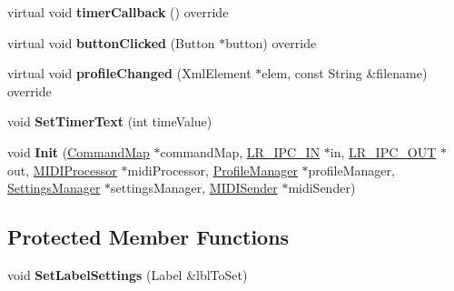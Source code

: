 \begin{DoxyCompactItemize}
\item 
virtual void {\bfseries timer\+Callback} () override\hypertarget{class_main_content_component_a5b7e48a7423f17bc799fc2990f48e38d}{}\label{class_main_content_component_a5b7e48a7423f17bc799fc2990f48e38d}

\item 
virtual void {\bfseries button\+Clicked} (Button $\ast$button) override\hypertarget{class_main_content_component_a72d6b006f4d4a6c4de2ca2e1bde18fc6}{}\label{class_main_content_component_a72d6b006f4d4a6c4de2ca2e1bde18fc6}

\item 
virtual void {\bfseries profile\+Changed} (Xml\+Element $\ast$elem, const String \&filename) override\hypertarget{class_main_content_component_adcb1797e988cf44e5c1811a1ae8144d5}{}\label{class_main_content_component_adcb1797e988cf44e5c1811a1ae8144d5}

\item 
void {\bfseries Set\+Timer\+Text} (int time\+Value)\hypertarget{class_main_content_component_a45f89996ceeb2243081dec7964f8a8c0}{}\label{class_main_content_component_a45f89996ceeb2243081dec7964f8a8c0}

\item 
void {\bfseries Init} (\hyperlink{class_command_map}{Command\+Map} $\ast$command\+Map, \hyperlink{class_l_r___i_p_c___i_n}{L\+R\+\_\+\+I\+P\+C\+\_\+\+IN} $\ast$in, \hyperlink{class_l_r___i_p_c___o_u_t}{L\+R\+\_\+\+I\+P\+C\+\_\+\+O\+UT} $\ast$out, \hyperlink{class_m_i_d_i_processor}{M\+I\+D\+I\+Processor} $\ast$midi\+Processor, \hyperlink{class_profile_manager}{Profile\+Manager} $\ast$profile\+Manager, \hyperlink{class_settings_manager}{Settings\+Manager} $\ast$settings\+Manager, \hyperlink{class_m_i_d_i_sender}{M\+I\+D\+I\+Sender} $\ast$midi\+Sender)\hypertarget{class_main_content_component_affa458ab3832dcd7ec8cc07247492498}{}\label{class_main_content_component_affa458ab3832dcd7ec8cc07247492498}

\end{DoxyCompactItemize}
\subsection*{Protected Member Functions}
\begin{DoxyCompactItemize}
\item 
void {\bfseries Set\+Label\+Settings} (Label \&lbl\+To\+Set)\hypertarget{class_main_content_component_a3591717702eb6417ff1d2646a7b59e90}{}\label{class_main_content_component_a3591717702eb6417ff1d2646a7b59e90}

\end{DoxyCompactItemize}
